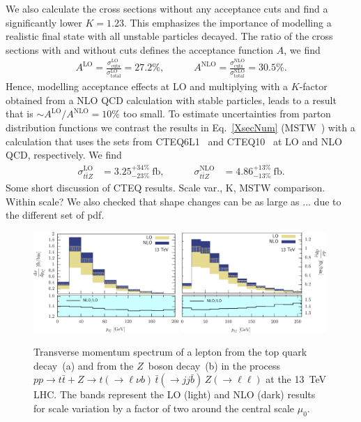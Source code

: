 \documentclass[preprint]{JHEP3}
\def\ttb{t\bar{t}}
\newcommand{\be}{\begin{eqnarray}}
\newcommand{\ee}{\end{eqnarray}}
\begin{document}
We also calculate the cross sections without any acceptance cuts and find 
a significantly lower  $K=1.23$. 
This emphasizes the importance of modelling a realistic final state with all unstable particles decayed.
The ratio of the cross sections with and without cuts defines the acceptance function $A$, we find
\be
  A^\mathrm{LO} = \frac{\sigma_{\mathrm{cuts}}^\mathrm{LO}}{\sigma_{\mathrm{total}}^\mathrm{LO}} = 27.2 \% ,
  \quad\quad\quad
  A^\mathrm{NLO} = \frac{\sigma_{\mathrm{cuts}}^\mathrm{NLO}}{\sigma_{\mathrm{total}}^\mathrm{NLO}} = 30.5 \%.
\ee
Hence, modelling acceptance effects at LO and multiplying with a $K$-factor obtained from a NLO QCD calculation with stable particles,
leads to a result that is $\sim A^\mathrm{LO}/A^\mathrm{NLO}=10\%$ too small.
To estimate uncertainties from parton distribution functions we contrast the results in Eq.~\ref{XsecNum} (MSTW~\cite{Martin:2009iq})
with a calculation that uses the sets from CTEQ6L1~\cite{Pumplin:2002vw} and CTEQ10~\cite{Lai:2010vv} at LO and NLO QCD, respectively. 
We find 
\be
\label{XsecNumCTEQ}
  \sigma_{\ttb Z}^\mathrm{LO} &= 3.25^{+34\%}_{-23\%}~\mathrm{fb},
  \quad\quad\quad
  \sigma_{\ttb Z}^\mathrm{NLO} &= 4.86^{+13\%}_{-13\%}~\mathrm{fb}.
\ee
Some short discussion of CTEQ results. Scale var., K, MSTW comparison. Within scale?
We also checked that shape changes can be as large as ... due to the different set of pdf.

\begin{figure}[t]
\centering %
\includegraphics[width=0.49\textwidth]{./LHC_53_Fig01.eps}
\hfill
\includegraphics[width=0.49\textwidth]{./LHC_53_Fig03.eps}
\caption{\label{fig:iii} Transverse momentum spectrum of a lepton from the top quark decay~(a) and from the $Z$~boson decay~(b) 
in the process $pp \to \ttb + Z \to t(\to \ell \nu b) \, \bar{t} (\to jj \bar{b}) \, Z(\to \ell \ell)$ at the 13~TeV LHC.
The bands represent the LO (light) and NLO (dark) results for scale variation by a factor of two around the central scale $\mu_0$.}
\end{figure}
\end{document}
